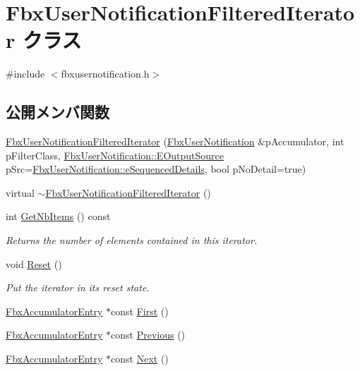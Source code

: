 \hypertarget{class_fbx_user_notification_filtered_iterator}{}\section{Fbx\+User\+Notification\+Filtered\+Iterator クラス}
\label{class_fbx_user_notification_filtered_iterator}


{\ttfamily \#include $<$fbxusernotification.\+h$>$}

\subsection*{公開メンバ関数}
\begin{DoxyCompactItemize}
\item 
\hyperlink{class_fbx_user_notification_filtered_iterator_a6e10f51f22b5d4e32fb4acfc4492091f}{Fbx\+User\+Notification\+Filtered\+Iterator} (\hyperlink{class_fbx_user_notification}{Fbx\+User\+Notification} \&p\+Accumulator, int p\+Filter\+Class, \hyperlink{class_fbx_user_notification_a45290aa788e47fce1d7b8a88687aa184}{Fbx\+User\+Notification\+::\+E\+Output\+Source} p\+Src=\hyperlink{class_fbx_user_notification_a45290aa788e47fce1d7b8a88687aa184a4f1172f3c9c59d12a175a66c71be2101}{Fbx\+User\+Notification\+::e\+Sequenced\+Details}, bool p\+No\+Detail=true)
\item 
virtual \hyperlink{class_fbx_user_notification_filtered_iterator_aa6d56d17ef3263a8043dbc73d652143b}{$\sim$\+Fbx\+User\+Notification\+Filtered\+Iterator} ()
\item 
int \hyperlink{class_fbx_user_notification_filtered_iterator_a66548434b844f1099637aa71eb485f9e}{Get\+Nb\+Items} () const
\begin{DoxyCompactList}\small\item\em Returns the number of elements contained in this iterator. \end{DoxyCompactList}\item 
void \hyperlink{class_fbx_user_notification_filtered_iterator_a0cd7bd9eb21f787767d5f603bfb0cf17}{Reset} ()
\begin{DoxyCompactList}\small\item\em Put the iterator in its reset state. \end{DoxyCompactList}\item 
\hyperlink{class_fbx_accumulator_entry}{Fbx\+Accumulator\+Entry} $\ast$const \hyperlink{class_fbx_user_notification_filtered_iterator_a61fc433ba00db459bac761a49e1121a2}{First} ()
\item 
\hyperlink{class_fbx_accumulator_entry}{Fbx\+Accumulator\+Entry} $\ast$const \hyperlink{class_fbx_user_notification_filtered_iterator_a6f53e9356bb96d31bcf1a9fbb342533a}{Previous} ()
\item 
\hyperlink{class_fbx_accumulator_entry}{Fbx\+Accumulator\+Entry} $\ast$const \hyperlink{class_fbx_user_notification_filtered_iterator_a52a38aed0f08e19410e1f45f0eba0115}{Next} ()
\end{DoxyCompactItemize}
